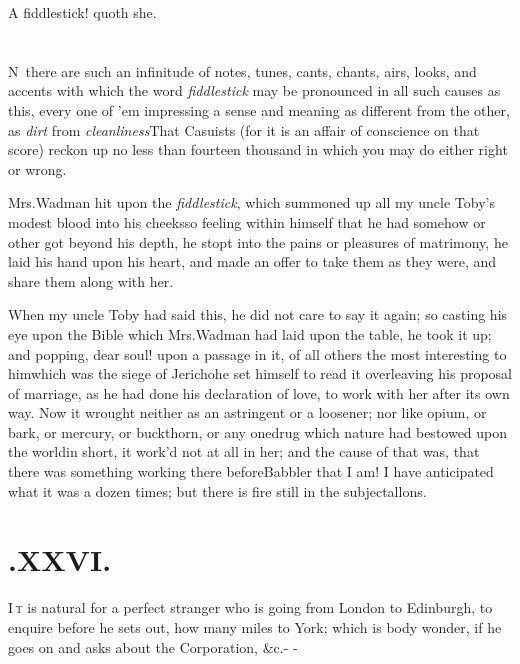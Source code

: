 \documentclass{article}
\begin{document}
\tsh A fiddlestick! quoth she.

\newpage
\section{}

\lettrine{N}{\,} there are such an infinitude of
notes, tunes, cants, chants, airs, looks, and accents with which
the word \textit{fiddlestick} may be pronounced in all
such causes as this, every one of ’em impressing a sense and
meaning as different from the other, as \textit{dirt} from
\textit{cleanliness}\break\tsk That Casuists (for it is an affair of
conscience on that score) reckon up no less than fourteen thousand
in which you may do either right or wrong.

Mrs.\@ Wadman hit upon the \textit{fiddlestick}, which
summoned up all my uncle Toby’s modest blood into his
cheeks\tsk so feeling within himself that he had somehow or other
got beyond his depth, he stopt\pb
{} 
into the pains or pleasures of matrimony, he laid his hand
upon his heart, and made an offer to take them as they were, and
share them along with her.

When my uncle Toby had said this, he did not care to say
it again; so casting his eye upon the Bible which 
Mrs.\@ Wadman had laid upon the table, he took it up; and popping,
dear soul! upon a passage in it, of all others the most interesting
to him\tsk which was the siege of Jericho\tsk he set
himself to read it over\tsk leaving his proposal of marriage, as he had done his declaration of love, to work with
her after its own way. Now it wrought neither as an astringent or a
loosener; nor like opium, or bark, or mercury, or buckthorn, or any
one\pb drug which nature had bestowed upon the world\tsk in short,
it work’d not at all in her; and the cause of that was, that
there was something working there before\tsh Babbler that
I am! I have anticipated what it was a dozen times; but there is
fire still in the subject\tsh\break allons.

\newpage
\section{.\enspace XXVI.}

\lettrine{I}{\,t} is natural for a perfect stranger
who is going from London to Edin\-burgh, to enquire
before he sets out, how many miles to York; which is\break
{} 
body wonder, if he goes on
and asks about the Corporation, \&c.\@ - -
\end{document}

